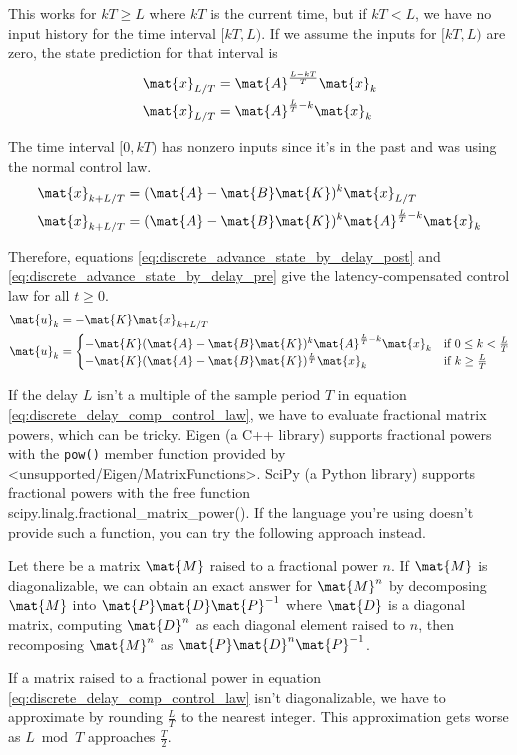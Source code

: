 This works for $kT \geq L$ where $kT$ is the current time, but if $kT < L$, we
have no input history for the time interval $[kT, L)$. If we assume the inputs
for $[kT, L)$ are zero, the state prediction for that interval is
\begin{align*}
  \mat{x}_{L/T} &= \mat{A}^\frac{L - kT}{T} \mat{x}_k \\
  \mat{x}_{L/T} &= \mat{A}^{\frac{L}{T} - k} \mat{x}_k
\end{align*}

The time interval $[0, kT)$ has nonzero inputs since it's in the past and was
using the normal control law.
\begin{align}
  \mat{x}_{k + L/T} &= (\mat{A} - \mat{B}\mat{K})^k \mat{x}_{L/T} \nonumber \\
  \mat{x}_{k + L/T} &= (\mat{A} - \mat{B}\mat{K})^k
    \mat{A}^{\frac{L}{T} - k} \mat{x}_k
    \label{eq:discrete_advance_state_by_delay_pre}
\end{align}

Therefore, equations \eqref{eq:discrete_advance_state_by_delay_post} and
\eqref{eq:discrete_advance_state_by_delay_pre} give the latency-compensated
control law for all $t \geq 0$.
\begin{align}
  \mat{u}_k &= -\mat{K} \mat{x}_{k + L/T} \nonumber \\
  \mat{u}_k &=
  \begin{cases}
    -\mat{K} (\mat{A} - \mat{B}\mat{K})^k \mat{A}^{\frac{L}{T} - k} \mat{x}_k &
      \text{if } 0 \leq k < \frac{L}{T} \\
    -\mat{K} (\mat{A} - \mat{B}\mat{K})^\frac{L}{T} \mat{x}_k &
      \text{if } k \geq \frac{L}{T}
  \end{cases}
  \label{eq:discrete_delay_comp_control_law}
\end{align}

If the delay $L$ isn't a multiple of the sample period $T$ in equation
\eqref{eq:discrete_delay_comp_control_law}, we have to evaluate fractional
matrix powers, which can be tricky. Eigen (a C++ library) supports fractional
powers with the \texttt{pow()} member function provided by\\
\mbox{<unsupported/Eigen/MatrixFunctions>}. SciPy (a Python library) supports
fractional powers with the free function\\
\mbox{scipy.linalg.fractional\_matrix\_power()}. If the language you're using
doesn't provide such a function, you can try the following approach instead.

Let there be a matrix $\mat{M}$ raised to a fractional power $n$. If $\mat{M}$
is diagonalizable, we can obtain an exact answer for $\mat{M}^n$ by decomposing
$\mat{M}$ into $\mat{P}\mat{D}\mat{P}^{-1}$ where $\mat{D}$ is a diagonal
matrix, computing $\mat{D}^n$ as each diagonal element raised to $n$, then
recomposing $\mat{M}^n$ as $\mat{P}\mat{D}^n\mat{P}^{-1}$.

If a matrix raised to a fractional power in equation
\eqref{eq:discrete_delay_comp_control_law} isn't diagonalizable, we have to
approximate by rounding $\frac{L}{T}$ to the nearest integer. This approximation
gets worse as $L \bmod T$ approaches $\frac{T}{2}$.
